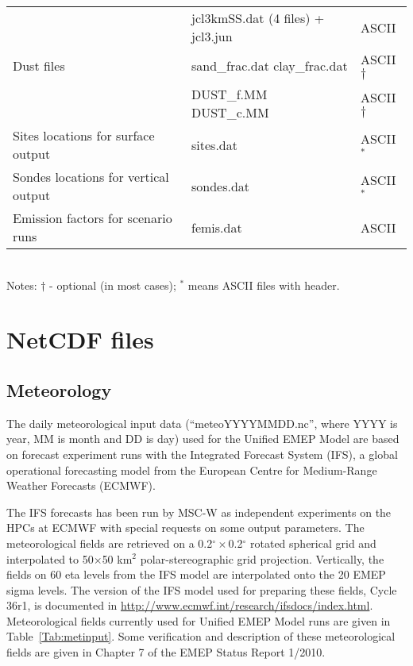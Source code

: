\begin{table}
\begin{center}
\begin{small}
\begin{tabular}{lll}
 & jcl3kmSS.dat \quad (4 files) + jcl3.jun & ASCII\\
Dust files & sand\_frac.dat clay\_frac.dat & ASCII$\dagger$\\
 & DUST\_f.MM DUST\_c.MM & ASCII$\dagger$\\
Sites locations for surface output & sites.dat & ASCII$^*$\\
Sondes locations for vertical output & sondes.dat & ASCII$^*$\\
Emission factors for scenario runs & femis.dat & ASCII\\
\hline
\end{tabular}\\
Notes: $\dagger$ - optional (in most cases); 
$^*$ means ASCII files with header.
\end{small}
\end{center}

\end{table}

\newpage
\section{NetCDF files}



\subsection{Meteorology}

The daily meteorological input data (``meteoYYYYMMDD.nc'', where YYYY is year, MM is month 
and DD is day) used for the Unified EMEP Model are based on
forecast experiment runs with the Integrated Forecast System (IFS), a global
operational forecasting model from the European Centre for Medium-Range
Weather Forecasts (ECMWF).

The IFS forecasts has been run by MSC-W as
independent experiments on the HPCs at ECMWF with special requests on
some output parameters. The meteorological fields are retrieved on a
0.2$^{\circ}\times$0.2$^{\circ}$ rotated spherical grid and interpolated to
50$\times$50 km$^2$ polar-stereographic grid projection. Vertically, the fields
on 60 eta levels from the IFS model are interpolated onto the 20 EMEP sigma
levels. The version of the IFS model used for preparing these fields,
Cycle 36r1, is documented in \url{http://www.ecmwf.int/research/ifsdocs/index.html}.
Meteorological fields currently used for Unified EMEP Model runs are given in
Table~\ref{Tab:metinput}. Some verification and description of these
meteorological fields are given in Chapter 7 of the EMEP Status Report
1/2010.

